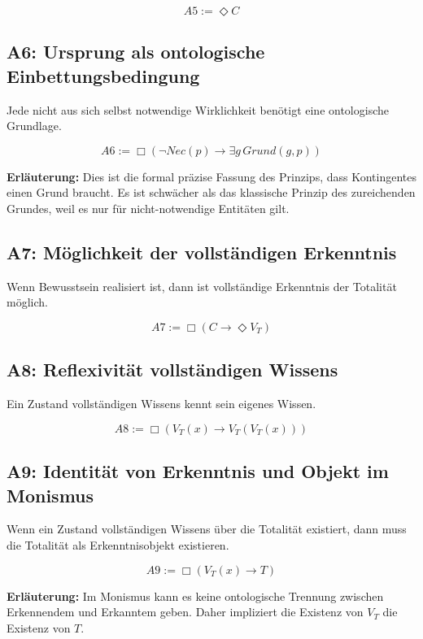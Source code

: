 \documentclass[
]{article}
\begin{document}
\[
\boxed{A5 := \Diamond C}
\]

\subsection{A6: Ursprung als ontologische Einbettungsbedingung}\label{a6-ursprung-als-ontologische-einbettungsbedingung}

Jede nicht aus sich selbst notwendige Wirklichkeit benötigt eine ontologische Grundlage.

\[
\boxed{A6 := \Box(\neg Nec(p) \rightarrow \exists g\, Grund(g,p))}
\]

\textbf{Erläuterung:} Dies ist die formal präzise Fassung des Prinzips, dass Kontingentes einen Grund braucht. Es ist schwächer als das klassische Prinzip des zureichenden Grundes, weil es nur für nicht-notwendige Entitäten gilt.

\subsection{A7: Möglichkeit der vollständigen Erkenntnis}\label{a7-moumlglichkeit-der-vollstuxe4ndigen-erkenntnis}

Wenn Bewusstsein realisiert ist, dann ist vollständige Erkenntnis der Totalität möglich.

\[
\boxed{A7 := \Box(C \rightarrow \Diamond V_T)}
\]

\subsection{A8: Reflexivität vollständigen Wissens}\label{a8-reflexivituxe4t-vollstuxe4ndigen-wissens}

Ein Zustand vollständigen Wissens kennt sein eigenes Wissen.

\[
\boxed{A8 := \Box(V_T(x) \rightarrow V_T(V_T(x)))}
\]

\subsection{A9: Identität von Erkenntnis und Objekt im Monismus}\label{a9-identituxe4t-von-erkenntnis-und-objekt-im-monismus}

Wenn ein Zustand vollständigen Wissens über die Totalität existiert, dann muss die Totalität als Erkenntnisobjekt existieren.

\[
\boxed{A9 := \Box(V_T(x) \rightarrow T)}
\]

\textbf{Erläuterung:} Im Monismus kann es keine ontologische Trennung zwischen Erkennendem und Erkanntem geben. Daher impliziert die Existenz von \(V_T\) die Existenz von \(T\).
\end{document}
